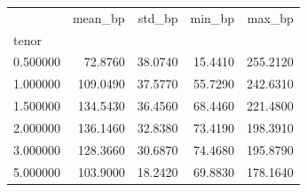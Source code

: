 \begin{tabular}{lrrrr}
\toprule
 & mean\_bp & std\_bp & min\_bp & max\_bp \\
tenor &  &  &  &  \\
\midrule
0.500000 & 72.8760 & 38.0740 & 15.4410 & 255.2120 \\
1.000000 & 109.0490 & 37.5770 & 55.7290 & 242.6310 \\
1.500000 & 134.5430 & 36.4560 & 68.4460 & 221.4800 \\
2.000000 & 136.1460 & 32.8380 & 73.4190 & 198.3910 \\
3.000000 & 128.3660 & 30.6870 & 74.4680 & 195.8790 \\
5.000000 & 103.9000 & 18.2420 & 69.8830 & 178.1640 \\
\bottomrule
\end{tabular}
